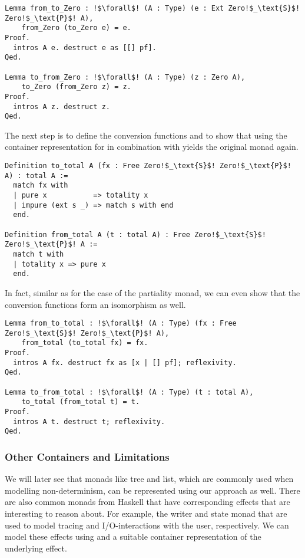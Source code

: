 \begin{verbatim}
Lemma from_to_Zero : !$\forall$! (A : Type) (e : Ext Zero!$_\text{S}$! Zero!$_\text{P}$! A),
    from_Zero (to_Zero e) = e.
Proof.
  intros A e. destruct e as [[] pf].
Qed.

Lemma to_from_Zero : !$\forall$! (A : Type) (z : Zero A),
    to_Zero (from_Zero z) = z.
Proof.
  intros A z. destruct z.
Qed.
\end{verbatim}

The next step is to define the conversion functions  and  to show that using the container representation for  in combination with  yields the original monad  again.

\begin{verbatim}
Definition to_total A (fx : Free Zero!$_\text{S}$! Zero!$_\text{P}$! A) : total A :=
  match fx with
  | pure x           => totality x
  | impure (ext s _) => match s with end
  end.

Definition from_total A (t : total A) : Free Zero!$_\text{S}$! Zero!$_\text{P}$! A :=
  match t with
  | totality x => pure x
  end.
\end{verbatim}

\noindent
In fact, similar as for the case of the partiality monad, we can even show that the conversion functions form an isomorphism as well.

\begin{verbatim}
Lemma from_to_total : !$\forall$! (A : Type) (fx : Free Zero!$_\text{S}$! Zero!$_\text{P}$! A),
    from_total (to_total fx) = fx.
Proof.
  intros A fx. destruct fx as [x | [] pf]; reflexivity.
Qed.

Lemma to_from_total : !$\forall$! (A : Type) (t : total A),
    to_total (from_total t) = t.
Proof.
  intros A t. destruct t; reflexivity.
Qed.
\end{verbatim}

\subsubsection{Other Containers and Limitations}

We will later see that monads like tree and list, which are commonly used when modelling non\--determinism, can be represented using our approach as well.
There are also common monads from Haskell that have corresponding effects that are interesting to reason about.
For example, the writer and state monad that are used to model tracing and I/O\--interactions with the user, respectively.
We can model these effects using  and a suitable container representation of the underlying effect.

